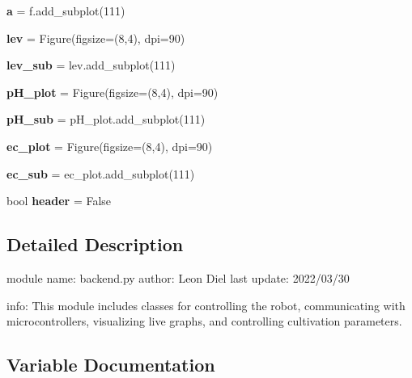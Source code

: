 \begin{DoxyCompactItemize}
\mbox{\label{namespacebackend_aa387c7eb8a92fb2cb4704b489227171b}} 
{\bfseries a} = f.\+add\+\_\+subplot(111)
\item 
\mbox{\label{namespacebackend_a8bd942824820aa2713ad7bc52606faf9}} 
{\bfseries lev} = Figure(figsize=(8,4), dpi=90)
\item 
\mbox{\label{namespacebackend_ad6ab0ed3806b9fb0f5f4c46e96a629c2}} 
{\bfseries lev\+\_\+sub} = lev.\+add\+\_\+subplot(111)
\item 
\mbox{\label{namespacebackend_abfbfc7d11b7f91d3cabbe9654120a7fa}} 
{\bfseries p\+H\+\_\+plot} = Figure(figsize=(8,4), dpi=90)
\item 
\mbox{\label{namespacebackend_add81d9b732626db28b08d88f590b6fa1}} 
{\bfseries p\+H\+\_\+sub} = p\+H\+\_\+plot.\+add\+\_\+subplot(111)
\item 
\mbox{\label{namespacebackend_a838ce55cf2d5b72ea50c5a4f98211931}} 
{\bfseries ec\+\_\+plot} = Figure(figsize=(8,4), dpi=90)
\item 
\mbox{\label{namespacebackend_a28c63029c75f495e357f9fc7fae0de85}} 
{\bfseries ec\+\_\+sub} = ec\+\_\+plot.\+add\+\_\+subplot(111)
\item 
\mbox{\label{namespacebackend_a9552000cebc21900bb1328c2e4fab281}} 
bool {\bfseries header} = False
\end{DoxyCompactItemize}


\subsection{Detailed Description}
\begin{DoxyVerb}module name: backend.py
author:      Leon Diel
last update: 2022/03/30

info:
    This module includes classes for controlling the robot, communicating with microcontrollers, visualizing live graphs, and controlling cultivation parameters.
\end{DoxyVerb}
 

\subsection{Variable Documentation}
\mbox{\label{namespacebackend_ab4701f5d026986460a4d66d745d8c147_ab4701f5d026986460a4d66d745d8c147}} 
